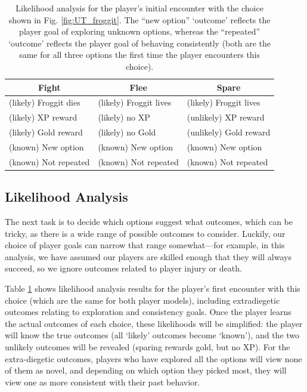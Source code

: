\documentclass[arts,article,submit,moreauthors,pdftex,10pt,a4paper]{Definitions/mdpi}
\begin{document}
\begin{table}[H]
\centering
\begin{tabular}{l l l}
  \toprule
 \multicolumn{1}{c}{\textbf{Fight}} & \multicolumn{1}{c}{\textbf{Flee}} & \multicolumn{1}{c}{\textbf{Spare}} \\
  \midrule
 (likely) Froggit dies & (likely) Froggit lives & (likely) Froggit lives \\
 (likely) XP reward & (likely) no XP & (unlikely) XP reward \\
 (likely) Gold reward & (likely) no Gold & (unlikely) Gold reward \\
 (known) New option & (known) New option & (known) New option \\
 (known) Not repeated & (known) Not repeated & (known) Not repeated \\
  \bottomrule
\end{tabular}
  \caption[\emph{Undertale} likelihood analysis]{Likelihood analysis for the player's initial encounter with the choice shown in Fig. \ref{fig:UT_froggit}. The ``new option'' `outcome' reflects the player goal of exploring unknown options, whereas the ``repeated'' `outcome' reflects the player goal of behaving consistently (both are the same for all three options the first time the player encounters this choice).}
\label{tab:UT_likelihoods}
\end{table}

\subsection{Likelihood Analysis}

The next task is to decide which options suggest what outcomes, which can be tricky, as there is a wide range of possible outcomes to consider.
%
Luckily, our choice of player goals can narrow that range somewhat---for example, in this analysis, we have assumed our players are skilled enough that they will always succeed, so we ignore outcomes related to player injury or death.


Table \ref{tab:UT_likelihoods} shows likelihood analysis results for the player's first encounter with this choice (which are the same for both player models), including extradiegetic outcomes relating to exploration and consistency goals.
%
Once the player learns the actual outcomes of each choice, these likelihoods will be simplified: the player will know the true outcomes (all `likely' outcomes become `known'), and the two unlikely outcomes will be revealed (sparing rewards gold, but no XP).
%
For the extra-diegetic outcomes, players who have explored all the options will view none of them as novel, and depending on which option they picked most, they will view one as more consistent with their past behavior.
\end{document}
